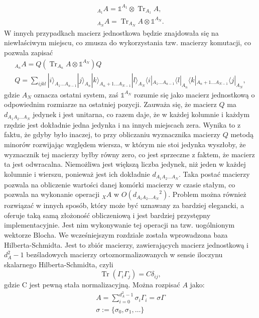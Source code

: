 \documentclass[10pt]{article} %
\DeclareMathOperator{\Trs}{Tr}
\newcommand{\Ket}[1]{|#1\rangle}
\newcommand{\Bra}[1]{\langle#1|}
\newcommand{\I}{\mathbb{1}}
\begin{document}
\begin{appendices}
\begin{gather}
{}_{A_1}A= \I^{A_1} \otimes \Trs_{A_1} A,\\
{}_{A_ N}A = \Trs_{A_N} A \otimes \I^{A_N}.
\end{gather}
W innych przypadkach macierz jednostkowa będzie znajdowała się na niewłaściwym miejscu, co zmusza do wykorzystania tzw. macierzy komutacji, co pozwala zapisać
\begin{gather}
{}_{A_n}A = Q\left( \Trs_{A_n}A \otimes \I^{A_N} \right)Q \\
Q = \sum_{ijkl} \Ket{i}_{A_1 \dots A_{n-1}} \Ket{j}_{A_n} \Ket{k}_{A_n+1 \dots A_{N-1}} \Ket{l}_{A_N}\Bra{i}_{A_1 \dots A_{n-1}} \Bra{l}_{A_n} \Bra{k}_{A_n+1 \dots A_{N-1}} \Bra{j}_{A_N},
\end{gather} gdzie $A_N$ oznacza ostatni system, zaś $\I^{A_N}$ rozumie się jako macierz jednostkową o odpowiednim rozmiarze na ostatniej pozycji. Zauważa się, że macierz $Q$ ma $d_{A_1 A_2 \dots A_N}$ jedynek i jest unitarna, co razem daje, że w każdej kolumnie i każdym rzędzie jest dokładnie jedna jedynka i na innych miejscach zera. Wynika to z faktu, że gdyby było inaczej, to przy obliczaniu wyznacznika macierzy $Q$ metodą minorów rozwijając względem wiersza, w którym nie stoi jedynka wyszłoby, że wyznacznik tej macierzy byłby równy zero, co jest sprzeczne z faktem, że macierz ta jest odwracalna. Niemożliwa jest większą liczba jedynek, niż jeden w każdej kolumnie i wierszu, ponieważ jest ich dokładnie $d_{A_1A_2\dots A_N}$. Taka postać macierzy pozwala na obliczenie wartości danej komórki macierzy w czasie stałym, co pozwala na wykonanie operacji ${}_XA$ w $O({d_{A_1 A_2 \dots A_N}}^2)$. Problem można również rozwiązać w innych sposób, który może być uznawany za bardziej elegancki, a oferuje taką samą złożoność obliczeniową i jest bardziej przystępny implementacyjnie. Jest nim wykonywanie tej operacji na tzw. uogólnionym wektorze Blocha. We wcześniejszym rozdziale została wprowadzona baza Hilberta-Schmidta. Jest to zbiór macierzy, zawierających macierz jednostkową i $d_A^2-1$ bezśladowych macierzy ortoznormalizowanych w sensie iloczynu skalarnego Hilberta-Schmidta, czyli
\begin{equation}
\Trs \left( \Gamma_i \Gamma_j \right) = C\delta_{ij},
\end{equation} gdzie C jest pewną stała normalizacyjną.
Można rozpisać $A$ jako:
\begin{gather}
A = \sum_{i=0}^{d^2_A-1} \sigma_i \Gamma_i = \mathbb{\sigma} \Gamma \\
\mathbb{\sigma} := \{ \sigma_0, \sigma_1, \dots \} \\

\end{gather}
\end{appendices}
\end{document}
